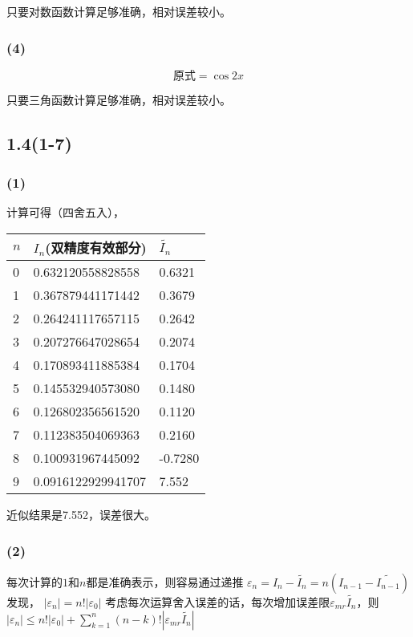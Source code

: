 \documentclass[UTF8,zihao=5]{ctexart}
\begin{document}
只要对数函数计算足够准确，相对误差较小。

\subsubsection*{(4)}

\begin{equation*}
    \text{原式}=\cos{2x}
\end{equation*}

只要三角函数计算足够准确，相对误差较小。

\subsection*{1.4(1-7)}

\subsubsection*{(1)}
计算可得（四舍五入），

\begin{table}[H]
    \begin{center}
        \begin{tabular}{lll}
            $n$ & $I_n$(双精度有效部分) & $\widetilde{I_n}$ \\
            \hline
            0   & 0.632120558828558     & 0.6321        \\
            1   & 0.367879441171442     & 0.3679        \\
            2   & 0.264241117657115     & 0.2642        \\
            3   & 0.207276647028654     & 0.2074        \\
            4   & 0.170893411885384     & 0.1704        \\
            5   & 0.145532940573080     & 0.1480        \\
            6   & 0.126802356561520     & 0.1120        \\
            7   & 0.112383504069363     & 0.2160        \\
            8   & 0.100931967445092     & -0.7280       \\
            9   & 0.0916122929941707    & 7.552         \\
            \hline
        \end{tabular}
    \end{center}
\end{table}

近似结果是7.552，误差很大。

\subsubsection*{(2)}
每次计算的$1$和$n$都是准确表示，则容易通过递推
$\varepsilon_n=I_n-\widetilde{I_n}=n\left(I_{n-1}-\widetilde{I_{n-1}}\right)$发现，
$|\varepsilon_n|=n!|\varepsilon_0|$
考虑每次运算舍入误差的话，每次增加误差限$\varepsilon_{mr}\widetilde{I_n}$，则
$|\varepsilon_n|\leq n!|\varepsilon_0|+\sum_{k=1}^n{(n-k)!\left|\varepsilon_{mr}\widetilde{I_n}\right|}$
\end{document}
